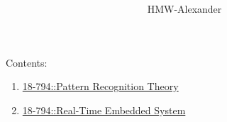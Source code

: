 \documentclass[letterpaper,11pt]{article}
\title{\textbf{}}
\author{HMW-Alexander}
\begin{document}
Contents:
\begin{enumerate}
	\item \href{./18794_Pattern_Recognition_Theory/Notes/document.html}{18-794::Pattern Recognition Theory}
	\item \href{./18648_Read-Time_Embedded_System/Notes/document.html}{18-794::Real-Time Embedded System}
\end{enumerate}	
	
\end{document}
